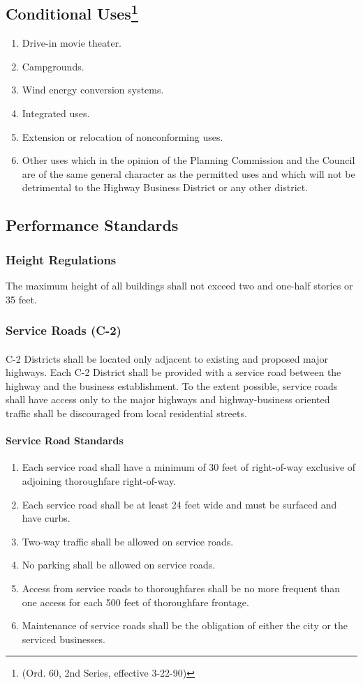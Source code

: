 \subsection{Conditional Uses\footnote{(Ord. 60, 2nd Series, effective 3-22-90)}}
\begin{enumerate}[{\indent}1)]
    \item Drive-in movie theater.  
    \item Campgrounds.  
    \item Wind energy conversion systems.
    \item Integrated uses.
    \item Extension or relocation of nonconforming uses.
    \item Other uses which in the opinion of the Planning Commission and the Council are of the same general character as the permitted uses and which will not be detrimental to the Highway Business District or any other district.
\end{enumerate}
\subsection{Performance Standards}
\subsubsection{Height Regulations}
The maximum height of all buildings shall not exceed two and one-half stories or 35 feet.
\subsubsection{Service Roads (C-2)}
\paragraph{}
C-2 Districts shall be located only adjacent to existing and proposed major highways. Each C-2 District shall be provided with a service road between the highway and the business establishment. To the extent possible, service roads shall have access only to the major highways and highway-business oriented traffic shall be discouraged from local residential streets.
\paragraph{Service Road Standards}
\begin{enumerate}[{\indent}1)]
    \item Each service road shall have a minimum of 30 feet of right-of-way exclusive of adjoining thoroughfare right-of-way.
    \item Each service road shall be at least 24 feet wide and must be surfaced and have curbs.
    \item Two-way traffic shall be allowed on service roads.
    \item No parking shall be allowed on service roads.
    \item Access from service roads to thoroughfares shall be no more frequent than one access for each 500 feet of thoroughfare frontage.
    \item Maintenance of service roads shall be the obligation of either the city or the serviced businesses.
\end{enumerate}
